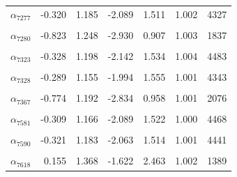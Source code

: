 \begin{longtable}{lrrrrrr}
$\alpha_{7277}$ & -0.320 & 1.185 & -2.089 & 1.511 & 1.002 & 4327\\
\cellcolor{gray!10}{$\alpha_{7279}$} & \cellcolor{gray!10}{-0.186} & \cellcolor{gray!10}{1.121} & \cellcolor{gray!10}{-1.835} & \cellcolor{gray!10}{1.643} & \cellcolor{gray!10}{1.002} & \cellcolor{gray!10}{3411}\\
$\alpha_{7280}$ & -0.823 & 1.248 & -2.930 & 0.907 & 1.003 & 1837\\
\cellcolor{gray!10}{$\alpha_{7316}$} & \cellcolor{gray!10}{-0.963} & \cellcolor{gray!10}{1.398} & \cellcolor{gray!10}{-3.423} & \cellcolor{gray!10}{0.910} & \cellcolor{gray!10}{1.003} & \cellcolor{gray!10}{1426}\\
$\alpha_{7323}$ & -0.328 & 1.198 & -2.142 & 1.534 & 1.004 & 4483\\
\cellcolor{gray!10}{$\alpha_{7324}$} & \cellcolor{gray!10}{-0.328} & \cellcolor{gray!10}{1.172} & \cellcolor{gray!10}{-2.126} & \cellcolor{gray!10}{1.506} & \cellcolor{gray!10}{1.001} & \cellcolor{gray!10}{4117}\\
$\alpha_{7328}$ & -0.289 & 1.155 & -1.994 & 1.555 & 1.001 & 4343\\
\cellcolor{gray!10}{$\alpha_{7363}$} & \cellcolor{gray!10}{-0.312} & \cellcolor{gray!10}{1.137} & \cellcolor{gray!10}{-2.050} & \cellcolor{gray!10}{1.448} & \cellcolor{gray!10}{1.001} & \cellcolor{gray!10}{4171}\\
$\alpha_{7367}$ & -0.774 & 1.192 & -2.834 & 0.958 & 1.001 & 2076\\
\cellcolor{gray!10}{$\alpha_{7385}$} & \cellcolor{gray!10}{-0.192} & \cellcolor{gray!10}{1.138} & \cellcolor{gray!10}{-1.848} & \cellcolor{gray!10}{1.650} & \cellcolor{gray!10}{1.001} & \cellcolor{gray!10}{3533}\\
$\alpha_{7581}$ & -0.309 & 1.166 & -2.089 & 1.522 & 1.000 & 4468\\
\cellcolor{gray!10}{$\alpha_{7582}$} & \cellcolor{gray!10}{-0.303} & \cellcolor{gray!10}{1.156} & \cellcolor{gray!10}{-2.023} & \cellcolor{gray!10}{1.508} & \cellcolor{gray!10}{1.002} & \cellcolor{gray!10}{4168}\\
$\alpha_{7590}$ & -0.321 & 1.183 & -2.063 & 1.514 & 1.001 & 4441\\
\cellcolor{gray!10}{$\alpha_{7612}$} & \cellcolor{gray!10}{-0.296} & \cellcolor{gray!10}{1.126} & \cellcolor{gray!10}{-2.023} & \cellcolor{gray!10}{1.475} & \cellcolor{gray!10}{1.002} & \cellcolor{gray!10}{4207}\\
$\alpha_{7618}$ & 0.155 & 1.368 & -1.622 & 2.463 & 1.002 & 1389\\

\end{longtable}
